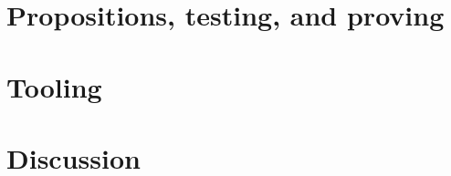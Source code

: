 \documentclass[submission,copyright,creativecommons]{eptcs}
\begin{document}
\section{Propositions, testing, and proving}
\label{sec:props}

\section{Tooling}
\label{sec:tools}

\section{Discussion}
\label{sec:discussion}




\end{document}
